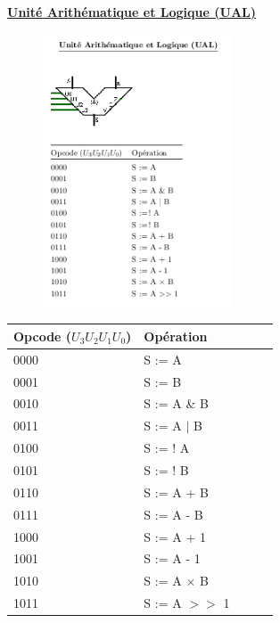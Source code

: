 \documentclass{standalone}
\begin{document}
\begin{minipage}{3in}
\setlength{\parindent}{10pt}
\setlength{\parskip}{3ex plus 0.5ex minus 0.2ex}

\textbf{\underline{Unité Arithématique et Logique (UAL)}}\\

\begin{figure}
\includegraphics[width=0.5\textwidth]{ual.png}
\end{figure}
\renewcommand{\arraystretch}{1.2}
\begin{tabular}{@{}lllll@{}}
\toprule
 Opcode ($U_3U_2U_1U_0$) & Opération \\
\toprule
0000 & S := A \\
0001 & S := B \\
0010 & S := A \& B\\
0011 & S := A $\mid$ B\\
0100 & S := ! A\\
0101 & S := ! B\\
0110 & S := A + B\\
0111 & S := A - B\\
1000 & S := A + 1\\
1001 & S := A - 1\\
1010 & S := A $\times$ B\\
1011 & S := A $>>$ 1\\
\end{tabular}

\end{minipage}
\end{document}
